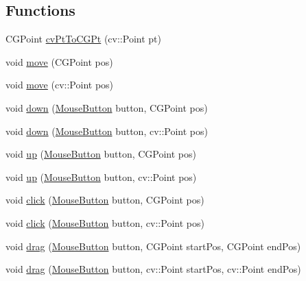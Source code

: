 \subsection*{Functions}
\begin{DoxyCompactItemize}
\item 
C\-G\-Point \hyperlink{namespaceosx_1_1mouse_a5beb2ba12cce052099603ac3002ec47f}{cv\-Pt\-To\-C\-G\-Pt} (cv\-::\-Point pt)
\item 
void \hyperlink{namespaceosx_1_1mouse_a96fc2b2983c0d9ee610ca9404ccc0506}{move} (C\-G\-Point pos)
\item 
void \hyperlink{namespaceosx_1_1mouse_a1671ac54e08642dea10d41ef9423c8d0}{move} (cv\-::\-Point pos)
\item 
void \hyperlink{namespaceosx_1_1mouse_af6a13b95720ba5d280a64dc3c169c4ab}{down} (\hyperlink{namespaceosx_1_1mouse_a025e93cf6af5808e4c8c2525fc668499}{Mouse\-Button} button, C\-G\-Point pos)
\item 
void \hyperlink{namespaceosx_1_1mouse_a707436c4ace9b3509137a0e84b395a4e}{down} (\hyperlink{namespaceosx_1_1mouse_a025e93cf6af5808e4c8c2525fc668499}{Mouse\-Button} button, cv\-::\-Point pos)
\item 
void \hyperlink{namespaceosx_1_1mouse_a653d01ba6a07d9a07581934e80cd5138}{up} (\hyperlink{namespaceosx_1_1mouse_a025e93cf6af5808e4c8c2525fc668499}{Mouse\-Button} button, C\-G\-Point pos)
\item 
void \hyperlink{namespaceosx_1_1mouse_aceec473053347deae91c85d33560e2fd}{up} (\hyperlink{namespaceosx_1_1mouse_a025e93cf6af5808e4c8c2525fc668499}{Mouse\-Button} button, cv\-::\-Point pos)
\item 
void \hyperlink{namespaceosx_1_1mouse_af0b3d4b3af410086362a3faaff78d3b6}{click} (\hyperlink{namespaceosx_1_1mouse_a025e93cf6af5808e4c8c2525fc668499}{Mouse\-Button} button, C\-G\-Point pos)
\item 
void \hyperlink{namespaceosx_1_1mouse_a4fb0394a644317eab05c06aed13e3d10}{click} (\hyperlink{namespaceosx_1_1mouse_a025e93cf6af5808e4c8c2525fc668499}{Mouse\-Button} button, cv\-::\-Point pos)
\item 
void \hyperlink{namespaceosx_1_1mouse_ac87df58c78bf4f2ed44eb74a272a155e}{drag} (\hyperlink{namespaceosx_1_1mouse_a025e93cf6af5808e4c8c2525fc668499}{Mouse\-Button} button, C\-G\-Point start\-Pos, C\-G\-Point end\-Pos)
\item 
void \hyperlink{namespaceosx_1_1mouse_ab88258b91b67cdf7b5949bc9664f2a85}{drag} (\hyperlink{namespaceosx_1_1mouse_a025e93cf6af5808e4c8c2525fc668499}{Mouse\-Button} button, cv\-::\-Point start\-Pos, cv\-::\-Point end\-Pos)
\end{DoxyCompactItemize}


